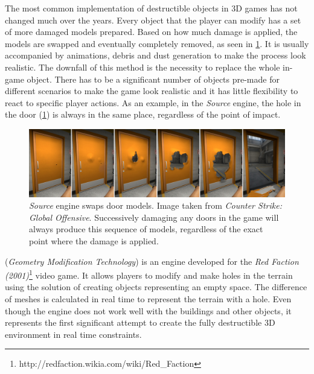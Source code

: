 The most common implementation of destructible objects in 3D games has not changed much over the years. Every object that the player can modify has a set of more damaged models prepared. Based on how much damage is applied, the models are swapped and eventually completely removed, as seen in \cref{fig:doors}. It is usually accompanied by animations, debris and dust generation to make the process look realistic. The downfall of this method is the necessity to replace the whole in-game object. There has to be a significant number of objects pre-made for different scenarios to make the game look realistic and it has little flexibility to react to specific player actions. As an example, in the \emph{Source} engine, the hole in the door (\cref{fig:doors}) is always in the same place, regardless of the point of impact.

\begin{figure} 
\centering
\includegraphics[width=\textwidth]{img/doors}
\caption{\emph{Source} engine swaps door models. Image taken from \emph{Counter Strike: Global Offensive}. Successively damaging any doors in the game will always produce this sequence of models, regardless of the exact point where the damage is applied.}
\label{fig:doors}
\end{figure}

 (\emph{Geometry Modification Technology}\cite{geomod}) is an engine developed for the \emph{Red Faction (2001)}\footnote{http://redfaction.wikia.com/wiki/Red\_Faction} video game. It allows players to modify and make holes in the terrain using the solution of creating objects representing an empty space. The difference of meshes is calculated in real time to represent the terrain with a hole. Even though the engine does not work well with the buildings and other objects, it represents the first significant attempt to create the fully destructible 3D environment in real time constraints.

